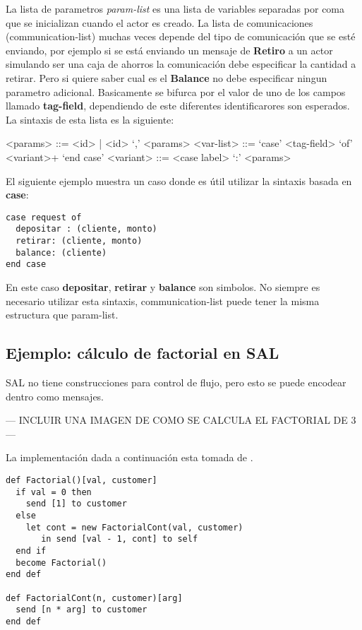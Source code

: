 \documentclass[fleqn]{article}
\begin{document}
La lista de parametros \textit{param-list} es una lista de variables separadas por coma
que se inicializan cuando el actor es creado. La lista de comunicaciones (communication-list)
muchas veces depende del tipo de comunicación que se esté enviando, por ejemplo
si se está enviando un mensaje de \textbf{Retiro} a un actor simulando ser una
caja de ahorros la comunicación debe especificar la cantidad a retirar. Pero si
quiere saber cual es el \textbf{Balance} no debe especificar ningun parametro
adicional.
Basicamente se bifurca por el valor de uno de los campos llamado
\textbf{tag-field}, dependiendo de este diferentes identificarores son esperados.
La sintaxis de esta lista es la siguiente:

\begin{grammar}
  <params> ::= <id> | <id> `,' <params>
  <var-list> ::= `case' <tag-field> `of' <variant>+ `end case'
  <variant> ::= <case label> `:' <params>
\end{grammar}

El siguiente ejemplo muestra un caso donde es útil utilizar la sintaxis basada
en \textbf{case}:

\begin{verbatim}
case request of 
  depositar : (cliente, monto) 
  retirar: (cliente, monto) 
  balance: (cliente) 
end case
\end{verbatim}

En este caso \textbf{depositar}, \textbf{retirar} y \textbf{balance} son
simbolos. 
No siempre es necesario utilizar esta sintaxis, communication-list puede tener
la misma estructura que param-list.

\subsection{Ejemplo: cálculo de factorial en SAL}

SAL no tiene construcciones para control de flujo, pero esto se puede encodear
dentro como mensajes.

--- INCLUIR UNA IMAGEN DE COMO SE CALCULA EL FACTORIAL DE 3 ---

La implementación dada a continuación esta tomada de \cite{Agha:1986:AMC:7929}.

\begin{lstlisting}[language=sal, style=simple]
def Factorial()[val, customer]
  if val = 0 then
    send [1] to customer
  else
    let cont = new FactorialCont(val, customer)
       in send [val - 1, cont] to self
  end if
  become Factorial()
end def

def FactorialCont(n, customer)[arg] 
  send [n * arg] to customer
end def
\end{lstlisting}
\end{document}
